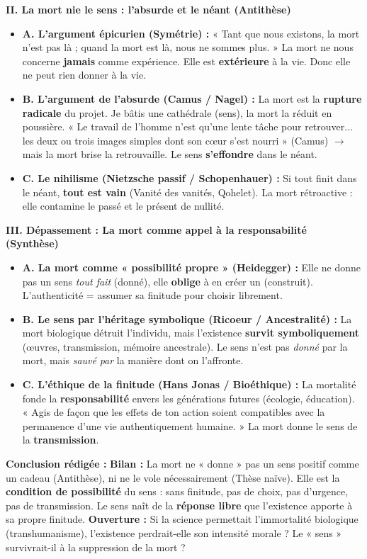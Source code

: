 \documentclass[11pt]{article}
\begin{document}
\begin{exoresolu}
\textbf{II. La mort nie le sens : l'absurde et le néant (Antithèse)}
\begin{itemize}
    \item \textbf{A. L'argument épicurien (Symétrie) :} « Tant que nous existons, la mort n'est pas là ; quand la mort est là, nous ne sommes plus. » La mort ne nous concerne \textbf{jamais} comme expérience. Elle est \textbf{extérieure} à la vie. Donc elle ne peut rien donner à la vie.
    \item \textbf{B. L'argument de l'absurde (Camus / Nagel) :} La mort est la \textbf{rupture radicale} du projet. Je bâtis une cathédrale (sens), la mort la réduit en poussière. « Le travail de l'homme n'est qu'une lente tâche pour retrouver... les deux ou trois images simples dont son cœur s'est nourri » (Camus) $\to$ mais la mort brise la retrouvaille. Le sens \textbf{s'effondre} dans le néant.
    \item \textbf{C. Le nihilisme (Nietzsche passif / Schopenhauer) :} Si tout finit dans le néant, \textbf{tout est vain} (Vanité des vanités, Qohelet). La mort rétroactive : elle contamine le passé et le présent de nullité.
\end{itemize}

\textbf{III. Dépassement : La mort comme appel à la responsabilité (Synthèse)}
\begin{itemize}
    \item \textbf{A. La mort comme « possibilité propre » (Heidegger) :} Elle ne donne pas un sens \emph{tout fait} (donné), elle \textbf{oblige} à en créer un (construit). L'authenticité = assumer sa finitude pour choisir librement.
    \item \textbf{B. Le sens par l'héritage symbolique (Ricoeur / Ancestralité) :} La mort biologique détruit l'individu, mais l'existence \textbf{survit symboliquement} (œuvres, transmission, mémoire ancestrale). Le sens n'est pas \emph{donné} par la mort, mais \emph{sauvé} \emph{par} la manière dont on l'affronte.
    \item \textbf{C. L'éthique de la finitude (Hans Jonas / Bioéthique) :} La mortalité fonde la \textbf{responsabilité} envers les générations futures (écologie, éducation). « Agis de façon que les effets de ton action soient compatibles avec la permanence d'une vie authentiquement humaine. » La mort donne le sens de la \textbf{transmission}.
\end{itemize}

\textbf{Conclusion rédigée :}
\textbf{Bilan :} La mort ne « donne » pas un sens positif comme un cadeau (Antithèse), ni ne le vole nécessairement (Thèse naïve). Elle est la \textbf{condition de possibilité} du sens : sans finitude, pas de choix, pas d'urgence, pas de transmission. Le sens naît de la \textbf{réponse libre} que l'existence apporte à sa propre finitude.
\textbf{Ouverture :} Si la science permettait l'immortalité biologique (transhumanisme), l'existence perdrait-elle son intensité morale ? Le « sens » survivrait-il à la suppression de la mort ?
\end{exoresolu}
\end{document}

